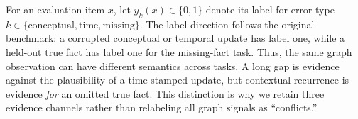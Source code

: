 For an evaluation item $x$, let $y_k(x)\in\{0,1\}$ denote its label for error type $k\in\{\mathrm{conceptual},\mathrm{time},\mathrm{missing}\}$. The label direction follows the original benchmark: a corrupted conceptual or temporal update has label one, while a held-out true fact has label one for the missing-fact task. Thus, the same graph observation can have different semantics across tasks. A long gap is evidence against the plausibility of a time-stamped update, but contextual recurrence is evidence \emph{for} an omitted true fact. This distinction is why we retain three evidence channels rather than relabeling all graph signals as ``conflicts.''

